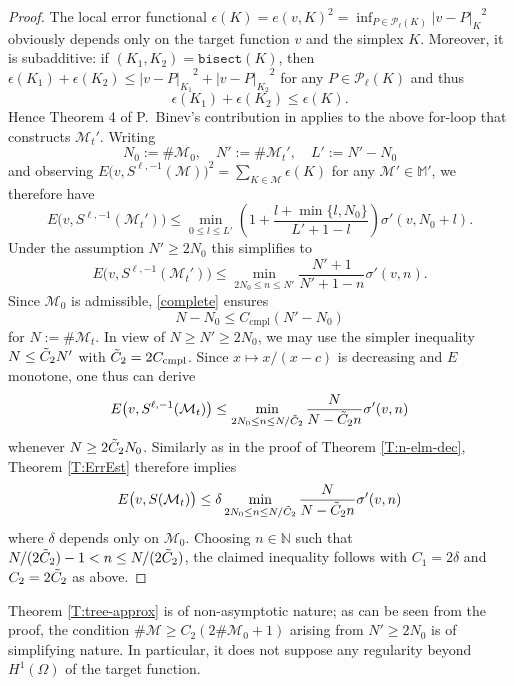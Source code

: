 \documentclass[a4paper]{amsart}
\numberwithin{equation}{section}
\theoremstyle{plain}
\theoremstyle{definition}
\begin{document}
\begin{proof}
The local error functional ${\epsilon}({K}) = e(v,{K})^2 = 
\inf_{P\in{\mathcal{P}_{{\ell}}({{K}})}} {\left|{v-P}\right|_{K}}^2$ obviously depends only on 
the target function $v$ and the simplex ${K}$.  Moreover, it is subadditive: 
if $({K}_1,{K}_2)=\texttt{bisect}({K})$, then ${\epsilon}({K}_1) + {\epsilon}({K}_2) 
\leq {\left|{v-P}\right|_{{{K}_1}}}^2 + {\left|{v-P}\right|_{{{K}_2}}}^2$ for any 
$P\in{\mathcal{P}_{{\ell}}({{K}})}$ and thus
\[
 {\epsilon}({K}_1) + {\epsilon}({K}_2) \leq {\epsilon}({K}).
\]
Hence Theorem 4 of P.~Binev's contribution in \cite{Oberwolfach4.3:07} 
applies to the above for-loop that constructs ${\mathcal{M}}_t'$.  Writing
\[
 N_0{:=}\#{\mathcal{M}}_0,
\quad
 N'{:=}\#{\mathcal{M}}_t',
\quad
 L'{:=} N'-N_0
\]
and observing $E\big( v,{S}^{{\ell},-1}({\mathcal{M}}) \big)^2 = 
\sum_{{K}\in{\mathcal{M}}} {\epsilon}({K})$ for any ${\mathcal{M}}'\in{\mathbb{M}}'$, we therefore have
\[
 E\big( v,{S}^{{\ell},-1}({\mathcal{M}}_t') \big)
 \leq
 \min_{0 \leq l \leq L'} \left( 1 +
   \frac{l + \min\{l,N_0\}}{L' + 1 - l}
   \right) \sigma'(v,N_0+l).
\]
Under the assumption $N'\geq2N_0$ this simplifies to
\[
 E\big( v,{S}^{{\ell},-1}({\mathcal{M}}_t') \big)
 \leq
 \min_{2N_0 \leq n \leq N'} \frac{N'+1}{N'+1-n} \sigma'(v,n).
\]
Since ${\mathcal{M}}_0$ is admissible, \eqref{complete} ensures
\[
 N - N_0
 \leq
 {{C_\text{cmpl}}} (N' - N_0)
\]
for $N{:=}\#{\mathcal{M}}_t$.  In view of $N\geq N'\geq 2N_0$, we may use the simpler 
inequality $N\leq \Tilde C_2 N'$ with $\Tilde C_2=2{{C_\text{cmpl}}}$.  Since $x\mapsto 
x/(x-c)$ is decreasing and $E$ monotone, one thus can derive
\[
 E\big( v,{S}^{{\ell},-1}({\mathcal{M}}_t) \big)
 \leq
 \min_{2N_0 \leq n \leq N/\Tilde C_2}
   \frac{N}{N - \Tilde C_2 n} \sigma'(v,n)
\]
whenever $N\geq 2\Tilde C_2 N_0$.  Similarly as in the proof of Theorem 
\ref{T:n-elm-dec}, Theorem \ref{T:ErrEst} therefore implies
\[
 E\big( v,{S}({\mathcal{M}}_t) \big)
 \leq
 \delta \min_{2N_0 \leq n \leq N/\Tilde C_2}
   \frac{N}{N - \Tilde C_2 n} \sigma'(v,n)
\]
where $\delta$ depends only on ${\mathcal{M}}_0$.  Choosing $n\in{\mathbb{N}}$ such that
$N/(2\Tilde C_2) -1 < n \leq N/(2\Tilde C_2)$, the claimed inequality 
follows with $C_1=2\delta$ and $C_2=2\Tilde C_2$ as above.
\end{proof}

Theorem \ref{T:tree-approx} is of non-asymptotic nature; as can be seen from 
the proof, the condition $\#{\mathcal{M}}\geq C_2(2\#{\mathcal{M}}_0+1)$ arising from 
$N'\geq2N_0$ is of simplifying nature.  In particular, it does not suppose any 
regularity beyond ${H^{1}}(\Omega)$ of the target function.  
\end{document}
